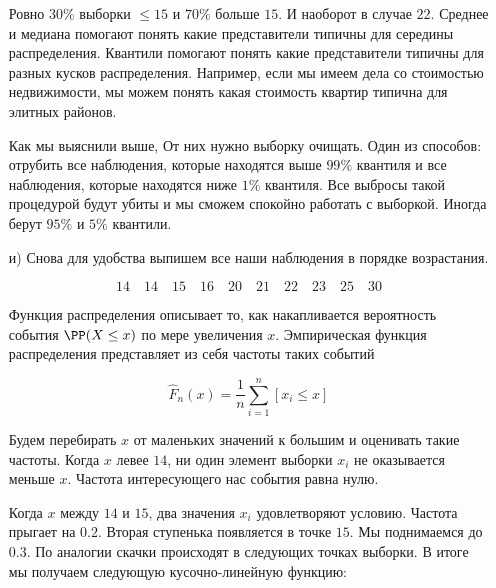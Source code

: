 \documentclass[12pt, a4paper, oneside]{article}
\begin{document}
\begin{sol}
\begin{enumerate}
	Ровно $30\%$ выборки $ \le 15$ и $70\%$ больше $15$. И наоборот в случае $22$. Среднее и медиана помогают понять какие представители типичны для середины распределения. Квантили помогают понять какие представители типичны для разных кусков распределения. Например, если мы имеем дела со стоимостью недвижимости, мы можем понять какая стоимость квартир типична для элитных районов. 

	Как мы выяснили выше,  От них нужно выборку очищать. Один из способов: отрубить все наблюдения, которые находятся выше $99\%$ квантиля и все наблюдения, которые находятся ниже $1\%$ квантиля. Все выбросы такой процедурой будут убиты и мы сможем спокойно работать с выборкой. Иногда берут $95\%$ и $5\%$ квантили. 
	
	\item[и)]  Снова для удобства выпишем все наши наблюдения в порядке возрастания. 
	
	\[
	14 \quad 14  \quad  15 \quad 16  \quad 20  \quad 21  \quad 22  \quad 23  \quad 25  \quad 30
	\]
	
	Функция распределения описывает то, как накапливается вероятность события $\PP(X \le x)$ по мере увеличения $x$. Эмпирическая функция распределения представляет из себя частоты таких событий
	
	\[
	\hat{F}_n(x) = \frac{1}{n} \sum_{i=1}^n [x_i \le x]
	\]
	
	Будем перебирать $x$ от маленьких значений к большим и оценивать такие частоты. Когда $x$ левее $14$, ни один элемент выборки $x_i$ не оказывается меньше $x$. Частота интересующего нас события равна нулю. 
	
	Когда $x$ между $14$ и $15$, два значения $x_i$ удовлетворяют условию. Частота прыгает на $0.2$. Вторая ступенька появляется в точке $15$. Мы поднимаемся до $0.3$. По аналогии скачки происходят в следующих точках выборки. В итоге мы получаем следующую кусочно-линейную функцию:

\begin{center}
\end{center}
\end{enumerate}
\end{sol}
\end{document}

